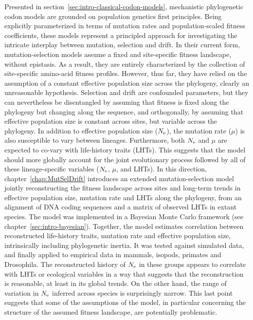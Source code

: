 Presented in section~\ref{sec:intro-classical-codon-models}, mechanistic phylogenetic codon models are grounded on population genetics first principles.
Being explicitly parameterized in terms of mutation rates and population-scaled fitness coefficients, these models represent a principled approach for investigating the intricate interplay between mutation, selection and drift.
In their current form, mutation-selection models assume a fixed and site-specific fitness landscape, without epistasis.
As a result, they are entirely characterized by the collection of site-specific amino-acid fitness profiles.
However, thus far, they have relied on the assumption of a constant effective population size across the phylogeny, clearly an unreasonable hypothesis.
Selection and drift are confounded parameters, but they can nevertheless be disentangled by assuming that fitness is fixed along the phylogeny but changing along the sequence, and orthogonally, by assuming that effective population size is constant across sites, but variable across the phylogeny.
In addition to effective population size ($N_{\text{e}}$), the mutation rate ($\mu$) is also susceptible to vary between lineages.
Furthermore, both $N_{\text{e}}$ and $\mu$ are expected to co-vary with life-history traits (\acrshort{LHT}s).
This suggests that the model should more globally account for the joint evolutionary process followed by all of these lineage-specific variables ($N_{\text{e}}$, $\mu$, and \acrshort{LHT}s).
In this direction, chapter~\ref{chap:MutSelDrift} introduces an extended mutation-selection model jointly reconstructing the fitness landscape across sites and long-term trends in effective population size, mutation rate and LHTs along the phylogeny, from an alignment of \acrshort{DNA} coding sequences and a matrix of observed LHTs in extant species.
The model was implemented in a Bayesian Monte Carlo framework (see chapter~\ref{sec:intro-bayesian}).
Together, the model estimates correlation between reconstructed life-history traits, mutation rate and effective population size, intrinsically including phylogenetic inertia.
It was tested against simulated data, and finally applied to empirical data in mammals, isopods, primates and Drosophila.
The reconstructed history of $N_{\text{e}}$ in these groups appears to correlate with LHTs or ecological variables in a way that suggests that the reconstruction is reasonable, at least in its global trends.
On the other hand, the range of variation in $N_{\text{e}}$ inferred across species is surprisingly narrow.
This last point suggests that some of the assumptions of the model, in particular concerning the structure of the assumed fitness landscape, are potentially problematic.


